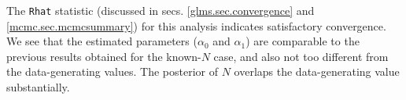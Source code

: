 The \mbox{\tt Rhat} statistic (discussed in secs. \ref{glms.sec.convergence} and
\ref{mcmc.sec.mcmcsummary}) for this analysis indicates satisfactory
convergence.
We see that the
estimated parameters ($\alpha_0$ and $\alpha_1$) are comparable to the
previous results obtained for the known-$N$ case, and also not too
different from the data-generating values. The posterior of $N$
overlaps the data-generating value substantially.


